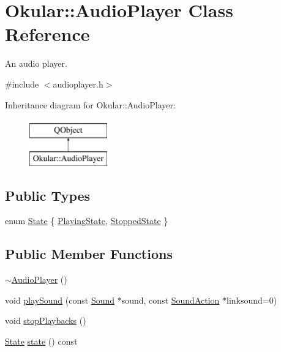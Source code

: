 \hypertarget{classOkular_1_1AudioPlayer}{\section{Okular\+:\+:Audio\+Player Class Reference}
\label{classOkular_1_1AudioPlayer}
}


An audio player.  




{\ttfamily \#include $<$audioplayer.\+h$>$}

Inheritance diagram for Okular\+:\+:Audio\+Player\+:\begin{figure}[H]
\begin{center}
\leavevmode
\includegraphics[height=2.000000cm]{classOkular_1_1AudioPlayer}
\end{center}
\end{figure}
\subsection*{Public Types}
\begin{DoxyCompactItemize}
\item 
enum \hyperlink{classOkular_1_1AudioPlayer_ab4aec223fcb227ab5cee9c525f6c5d6e}{State} \{ \hyperlink{classOkular_1_1AudioPlayer_ab4aec223fcb227ab5cee9c525f6c5d6eab5ce6ae3e434b775cda810ad636ff4fc}{Playing\+State}, 
\hyperlink{classOkular_1_1AudioPlayer_ab4aec223fcb227ab5cee9c525f6c5d6ea8aff55f41e3daefa1c9a2268d7df5c3b}{Stopped\+State}
 \}
\end{DoxyCompactItemize}
\subsection*{Public Member Functions}
\begin{DoxyCompactItemize}
\item 
\hyperlink{classOkular_1_1AudioPlayer_a41d5beac7ef47d2d935f17e822cbfd9f}{$\sim$\+Audio\+Player} ()
\item 
void \hyperlink{classOkular_1_1AudioPlayer_aaac62ab7c23b6ff11162c1943cd535a5}{play\+Sound} (const \hyperlink{classOkular_1_1Sound}{Sound} $\ast$sound, const \hyperlink{classOkular_1_1SoundAction}{Sound\+Action} $\ast$linksound=0)
\item 
void \hyperlink{classOkular_1_1AudioPlayer_a48730f5eb7dbc0551679c367e0ba9234}{stop\+Playbacks} ()
\item 
\hyperlink{classOkular_1_1AudioPlayer_ab4aec223fcb227ab5cee9c525f6c5d6e}{State} \hyperlink{classOkular_1_1AudioPlayer_a2bb80dfcea095a598c43e4852b1005ab}{state} () const 
\end{DoxyCompactItemize}
